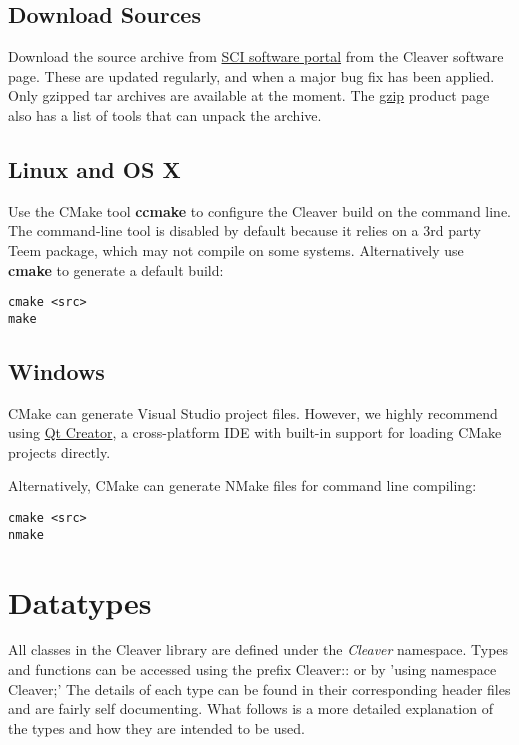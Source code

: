 \documentclass[fleqn,12pt,openany]{book}
\begin{document}
\section{Download Sources}

Download the source archive from
\href{http://software.sci.utah.edu}{SCI software portal} from the Cleaver software page.
These are updated regularly, and when a major bug fix has been applied. Only
gzipped tar archives are available at the moment. The \href{http://www.gzip.org/}{gzip} 
product page also has a list of tools that can unpack the archive.

\section{Linux and OS X}

Use the CMake tool \textbf{ccmake} to configure the Cleaver build on the
command line. The command-line tool is disabled by default because it
relies on a 3rd party Teem package, which may not compile on some systems.
Alternatively use \textbf{cmake} to generate a default build:

\begin{Verbatim}[frame=single]
cmake <src>
make
\end{Verbatim}

\section{Windows}

CMake can generate Visual Studio project files. However, we highly recommend 
using \href{http://qt-project.org/wiki/Category:Tools::QtCreator}{Qt Creator}, 
a cross-platform IDE with built-in support for loading CMake projects
directly.

Alternatively, CMake can generate NMake files for command line compiling:

\begin{Verbatim}[frame=single]
cmake <src>
nmake
\end{Verbatim}



\chapter{Datatypes}

All classes in the Cleaver library are defined under
the \emph{Cleaver} namespace. Types and functions 
can be accessed using the prefix Cleaver:: or by
'using namespace Cleaver;' The details of each type
can be found in their corresponding header files
and are fairly self documenting. What follows is
a more detailed explanation of the types and how
they are intended to be used.
\end{document}
